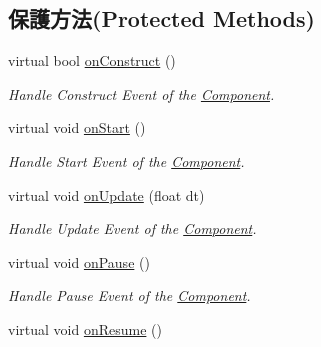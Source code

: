 \subsection*{保護方法(Protected Methods)}
\begin{DoxyCompactItemize}
\item 
virtual bool \hyperlink{class_magnum_1_1_camera_component_ac7ea89b8cd16133d963a5cc54942f22f}{on\+Construct} ()
\begin{DoxyCompactList}\small\item\em Handle Construct Event of the \hyperlink{class_magnum_1_1_component}{Component}. \end{DoxyCompactList}\item 
virtual void \hyperlink{class_magnum_1_1_camera_component_ae4ee1cdff7b10f4d275d4db47e7f2c55}{on\+Start} ()\hypertarget{class_magnum_1_1_camera_component_ae4ee1cdff7b10f4d275d4db47e7f2c55}{}\label{class_magnum_1_1_camera_component_ae4ee1cdff7b10f4d275d4db47e7f2c55}

\begin{DoxyCompactList}\small\item\em Handle Start Event of the \hyperlink{class_magnum_1_1_component}{Component}. \end{DoxyCompactList}\item 
virtual void \hyperlink{class_magnum_1_1_camera_component_aaf42005f7bc8c4f93b609c8666d65a30}{on\+Update} (float dt)
\begin{DoxyCompactList}\small\item\em Handle Update Event of the \hyperlink{class_magnum_1_1_component}{Component}. \end{DoxyCompactList}\item 
virtual void \hyperlink{class_magnum_1_1_camera_component_af22f1839001c7eea5c4de87fd5901212}{on\+Pause} ()\hypertarget{class_magnum_1_1_camera_component_af22f1839001c7eea5c4de87fd5901212}{}\label{class_magnum_1_1_camera_component_af22f1839001c7eea5c4de87fd5901212}

\begin{DoxyCompactList}\small\item\em Handle Pause Event of the \hyperlink{class_magnum_1_1_component}{Component}. \end{DoxyCompactList}\item 
virtual void \hyperlink{class_magnum_1_1_camera_component_a5808958ab0c9cd496bf419b15a9bab1f}{on\+Resume} ()\hypertarget{class_magnum_1_1_camera_component_a5808958ab0c9cd496bf419b15a9bab1f}{}\label{class_magnum_1_1_camera_component_a5808958ab0c9cd496bf419b15a9bab1f}


\end{DoxyCompactItemize}
